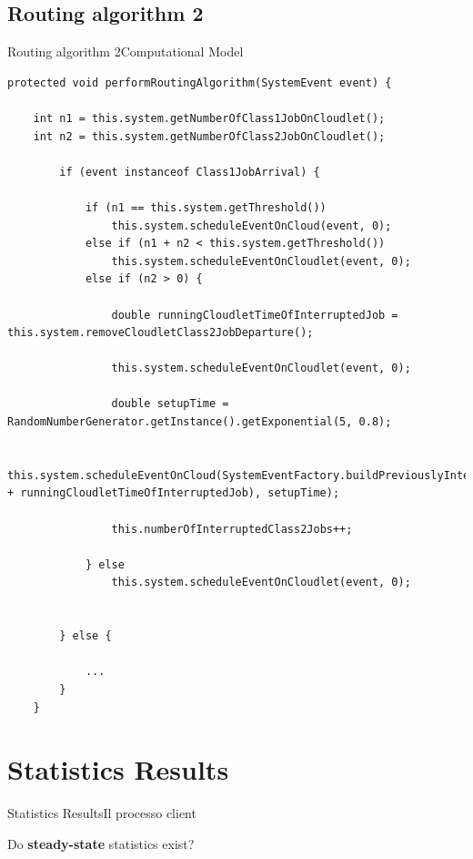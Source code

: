 \documentclass[10pt]{beamer}
\begin{document}
\subsection{Routing algorithm 2}
\begin{frame}[fragile]{Routing algorithm 2}{Computational Model}

\begin{lstlisting}
protected void performRoutingAlgorithm(SystemEvent event) {

    int n1 = this.system.getNumberOfClass1JobOnCloudlet();
    int n2 = this.system.getNumberOfClass2JobOnCloudlet();

        if (event instanceof Class1JobArrival) {

            if (n1 == this.system.getThreshold())
                this.system.scheduleEventOnCloud(event, 0);
            else if (n1 + n2 < this.system.getThreshold())
                this.system.scheduleEventOnCloudlet(event, 0);
            else if (n2 > 0) {

                double runningCloudletTimeOfInterruptedJob = this.system.removeCloudletClass2JobDeparture();

                this.system.scheduleEventOnCloudlet(event, 0);

                double setupTime = RandomNumberGenerator.getInstance().getExponential(5, 0.8);

                this.system.scheduleEventOnCloud(SystemEventFactory.buildPreviouslyInterruptedClass2JobArrival(setupTime + runningCloudletTimeOfInterruptedJob), setupTime);

                this.numberOfInterruptedClass2Jobs++;

            } else
                this.system.scheduleEventOnCloudlet(event, 0);


        } else {

            ...
        }
    }
\end{lstlisting}
\end{frame}


\section{Statistics Results}

\begin{frame}[fragile]{Statistics Results}{Il processo client}

\vspace*{20px}
Do \textbf{steady-state} statistics exist?


\end{frame}
\end{document}
